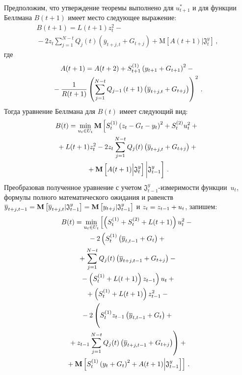 \begin{multicols}{2}
  Предположим, что утверждение теоремы выполнено для $u^*_{t+1}$ и для функции 
Беллмана $B(t+1)$ имеет место следующее выражение:
  \begin{multline*}
  B(t+1) = L(t+1) z_t^2 -{}\\
{}-2z_t\sum\limits_{j=1}^{N-t} Q_j(t) \left( 
\overline{y}_{t+j,t}+G_{t+j}\right) +\mathrm{M}\left[ A(t+1)\vert \mathfrak{J}^y_t\right]\,,
\end{multline*}
где
\begin{multline*}
A(t+1) = A(t+2) +S_{t+1}^{(1)}\left( y_{t+1} +G_{t+1}\right)^2 -{}\\
{}-\displaystyle\frac{\displaystyle 1\mathstrut}{\displaystyle R(t+1)\mathstrut}\left( 
\sum\limits_{j=1}^{N-t} Q_{j-1}\left(t+1\right)\left( \overline{y}_{t+j,t}+G_{t+j}\right) 
\right)^2\,.
  \end{multline*}
  Тогда уравнение Беллмана для $B(t)$ имеет сле\-ду\-ющий вид:
  \begin{multline*}
  B(t) = \min\limits_{u_t\in U_t} \mathbf{M}\left[ S_t^{(1)}\left( z_t-G_t-y_t\right)^2+
  S_t^{(2)} u_t^2+{}\right.\\
{}+L(t+1)z_t^2- 2z_t\sum\limits_{j=1}^{N-t} Q_j(t)\left( 
\overline{y}_{t+j,t}+G_{t+j}\right) +{}\\
  \left.{}+ \mathbf{M} \left[ A(t+1)\Big\vert \mathfrak{J}^y_t\right]\bigg \vert \mathfrak{J}^y_{t-1}
\vphantom{S_t^{(1)}\left( z_t-G_t-y_t\right)^2}\right]\,.
  \end{multline*}
    Преобразовав полученное уравнение с учетом $\mathfrak{J}^y_{t-1}$-из\-ме\-ри\-мости 
функции~$u_t$, формулы полного математического ожидания и равенств 
$\overline{y}_{t+j,t-1}\hm= \mathbf{M}\left[ \overline{y}_{t+j,t}\vert \mathfrak{J}^y_{t-
1}\right] \hm= \mathbf{M}\left[ y_{t+j}\vert \mathfrak{J}^y_{t-1}\right]$ и $z_t\hm= z_{t-
1}\hm+u_t$, запишем:
  \begin{multline*}
  B(t) =\min\limits_{u_t\in U_t}\left[ 
  \left( S_t^{(1)} +S_t^{(2)} +L(t+1)\right)u_t^2-{}\right.\\
  {}-
  2\left( S_t^{(1)} \left( \overline{y}_{t,t-1}+G_t\right) +{}\right.\\
   {}+\sum\limits_{j=1}^{N-t} Q_j(t)\left( 
\overline{y}_{t+j,t-1}+G_{t+j}\right) -{}\\
\left.{}-\left(
  S_t^{(1)}+L(t+1)\right)z_{t-1}\right) u_t+{}\\
 {}+
  \left( S_t^{(1)}+L(t+1)\right) z^2_{t-1} -{}\\
  {}-
  2\left( \vphantom{\sum\limits^{N-t}_{j=1}}
  S_t^{(1)} z_{t-1}\left( \overline{y}_{t,t-1}+G_t\right)+{}\right.\\
 \left.{}+
  z_{t-1}\sum\limits^{N-t}_{j=1} Q_j(t) \left( \overline{y}_{t+j,t-1}+G_{t+j}\right)\right) +{}\\
\left.  {}+
  \mathbf{M}\left[ S_t^{(1)}\left( y_t+G_t\right)^2+A(t+1)\Big\vert \mathfrak{J}^y_{t-
1}\right]\right]\,.
  \end{multline*}


\end{multicols}
